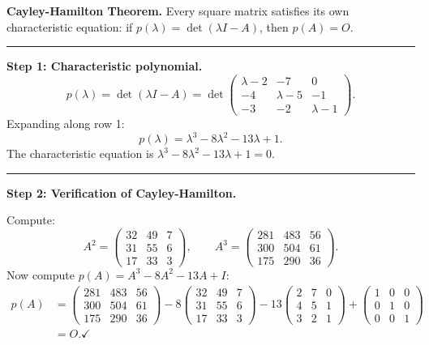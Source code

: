 \documentclass[12pt,a3paper]{article}
\begin{document}
 
\begin{tcolorbox}[enhanced,breakable,
  colback=cE!4,colframe=cE,boxrule=0.8pt,arc=5pt,
  title={\textbf{Answer --- Cayley-Hamilton Theorem \& Inverse for $A=\begin{pmatrix}2&7&0\\4&5&1\\3&2&1\end{pmatrix}$}},
  fonttitle=\bfseries\color{white},colbacktitle=cE]
 
\textbf{Cayley-Hamilton Theorem.} Every square matrix satisfies its own characteristic equation: if $p(\lambda)=\det(\lambda I - A)$, then $p(A)=O$.
 
\medskip\textcolor{cE}{\rule{\textwidth}{0.4pt}}
 
\textbf{Step 1: Characteristic polynomial.}
\[
  p(\lambda) = \det(\lambda I - A)
  = \det\begin{pmatrix}\lambda-2&-7&0\\-4&\lambda-5&-1\\-3&-2&\lambda-1\end{pmatrix}.
\]
Expanding along row 1:
\[
  p(\lambda) = \lambda^3 - 8\lambda^2 - 13\lambda + 1.
\]
The characteristic equation is $\lambda^3 - 8\lambda^2 - 13\lambda + 1 = 0$.
 
\medskip\textcolor{cE}{\rule{\textwidth}{0.4pt}}
 
\textbf{Step 2: Verification of Cayley-Hamilton.}
 
Compute:
\[
  A^2 = \begin{pmatrix}32&49&7\\31&55&6\\17&33&3\end{pmatrix}, \qquad
  A^3 = \begin{pmatrix}281&483&56\\300&504&61\\175&290&36\end{pmatrix}.
\]
Now compute $p(A) = A^3 - 8A^2 - 13A + I$:
\begin{align*}
  p(A) &= \begin{pmatrix}281&483&56\\300&504&61\\175&290&36\end{pmatrix}
         - 8\begin{pmatrix}32&49&7\\31&55&6\\17&33&3\end{pmatrix}
         - 13\begin{pmatrix}2&7&0\\4&5&1\\3&2&1\end{pmatrix}
         + \begin{pmatrix}1&0&0\\0&1&0\\0&0&1\end{pmatrix} \\[4pt]
       &= O. \checkmark
\end{align*}
 

\end{tcolorbox}
\end{document}
